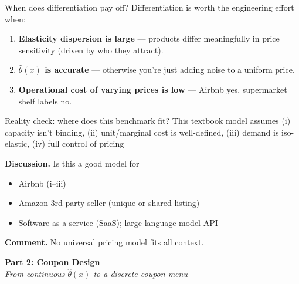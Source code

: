 \documentclass[aspectratio=169, 11pt, handout]{beamer}
\begin{document}
\begin{frame}{When does differentiation pay off?}
Differentiation is worth the engineering effort when:
\vspace{0.4em}

\begin{enumerate}
    \item \textbf{Elasticity dispersion is large} --- products differ meaningfully in price sensitivity (driven by who they attract).
    \item \textbf{$\hat\theta(x)$ is accurate} --- otherwise you're just adding noise to a uniform price.
    \item \textbf{Operational cost of varying prices is low} --- Airbnb yes, supermarket shelf labels no.
\end{enumerate}

\end{frame}

\begin{frame}{Reality check: where does this benchmark fit?}
This textbook model assumes (i) capacity isn't binding, (ii) unit/marginal cost is well-defined, (iii) demand is iso-elastic, (iv) full control of pricing

\bigskip

\textbf{Discussion.} Is this a good model for 

\begin{itemize}
    \item Airbnb (i--iii)
    \item Amazon 3rd party seller (unique or shared listing)
    \item Software as a service (SaaS); large language model API
\end{itemize}

\bigskip

\textbf{Comment.} No universal pricing model fits all context. 

\end{frame}




\begin{frame}
    \centering
    \vfill
    {\LARGE \textcolor{noteblue}{\textbf{Part 2: Coupon Design}}}\\[0.8em]
    {\small \itshape From continuous $\hat\theta(x)$ to a discrete coupon menu}
    \vfill
\end{frame}
\end{document}
